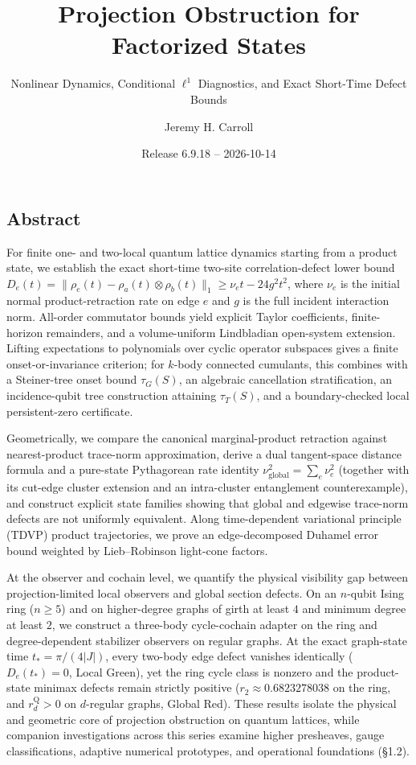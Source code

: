 \documentclass[
  11pt,
]{article}
\title{Projection Obstruction for Factorized States}
\subtitle{Nonlinear Dynamics, Conditional \(\ell^1\) Diagnostics, and Exact Short-Time Defect Bounds}
\author{Jeremy H. Carroll}
\date{Release 6.9.18 -- 2026-10-14}
\begin{document}
\maketitle

{
\hypersetup{linkcolor=}
\setcounter{tocdepth}{2}
\tableofcontents
}
\subsection{Abstract}\label{abstract}

For finite one- and two-local quantum lattice dynamics starting from a product state, we establish the exact short-time two-site correlation-defect lower bound
\(D_e(t)=\lVert\rho_e(t)-\rho_a(t)\otimes\rho_b(t)\rVert_1\geq\nu_e t-24g^2t^2\), where \(\nu_e\) is the initial normal product-retraction rate on edge \(e\) and \(g\) is the full incident interaction norm. All-order commutator bounds yield explicit Taylor coefficients, finite-horizon remainders, and a volume-uniform Lindbladian open-system extension. Lifting expectations to polynomials over cyclic operator subspaces gives a finite onset-or-invariance criterion; for \(k\)-body connected cumulants, this combines with a Steiner-tree onset bound \(\tau_G(S)\), an algebraic cancellation stratification, an incidence-qubit tree construction attaining \(\tau_T(S)\), and a boundary-checked local persistent-zero certificate.

Geometrically, we compare the canonical marginal-product retraction against nearest-product trace-norm approximation, derive a dual tangent-space distance formula and a pure-state Pythagorean rate identity \(\nu_{\mathrm{global}}^2=\sum_e\nu_e^2\) (together with its cut-edge cluster extension and an intra-cluster entanglement counterexample), and construct explicit state families showing that global and edgewise trace-norm defects are not uniformly equivalent. Along time-dependent variational principle (TDVP) product trajectories, we prove an edge-decomposed Duhamel error bound weighted by Lieb--Robinson light-cone factors.

At the observer and cochain level, we quantify the physical visibility gap between projection-limited local observers and global section defects. On an \(n\)-qubit Ising ring (\(n\ge 5\)) and on higher-degree graphs of girth at least \(4\) and minimum degree at least \(2\), we construct a three-body cycle-cochain adapter on the ring and degree-dependent stabilizer observers on regular graphs. At the exact graph-state time \(t_*=\pi/(4|J|)\), every two-body edge defect vanishes identically (\(D_e(t_*)=0\), Local Green), yet the ring cycle class is nonzero and the product-state minimax defects remain strictly positive (\(r_2\approx0.6823278038\) on the ring, and \(r_d^{\mathrm{Q}} > 0\) on \(d\)-regular graphs, Global Red). These results isolate the physical and geometric core of projection obstruction on quantum lattices, while companion investigations across this series examine higher presheaves, gauge classifications, adaptive numerical prototypes, and operational foundations (§1.2).
\end{document}
